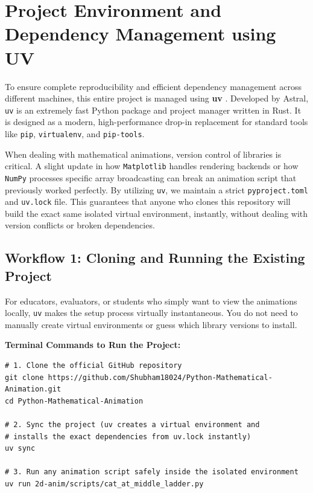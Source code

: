 \documentclass[12pt, a4paper]{report}
\begin{document}
\section{Project Environment and Dependency Management using UV}

To ensure complete reproducibility and efficient dependency management across different machines, this entire project is managed using \textbf{uv} \cite{uv_docs}. Developed by Astral, \texttt{uv} is an extremely fast Python package and project manager written in Rust. It is designed as a modern, high-performance drop-in replacement for standard tools like \texttt{pip}, \texttt{virtualenv}, and \texttt{pip-tools}.

When dealing with mathematical animations, version control of libraries is critical. A slight update in how \texttt{Matplotlib} handles rendering backends or how \texttt{NumPy} processes specific array broadcasting can break an animation script that previously worked perfectly. By utilizing \texttt{uv}, we maintain a strict \texttt{pyproject.toml} and \texttt{uv.lock} file. This guarantees that anyone who clones this repository will build the exact same isolated virtual environment, instantly, without dealing with version conflicts or broken dependencies.

\subsection{Workflow 1: Cloning and Running the Existing Project}
For educators, evaluators, or students who simply want to view the animations locally, \texttt{uv} makes the setup process virtually instantaneous. You do not need to manually create virtual environments or guess which library versions to install.

\vspace{0.2cm}
\begin{mdframed}[backgroundcolor=gray!10, linecolor=black, linewidth=1pt, roundcorner=5pt]
    \textbf{Terminal Commands to Run the Project:}
    \vspace{0.1cm}
    \begin{verbatim}
# 1. Clone the official GitHub repository
git clone https://github.com/Shubham18024/Python-Mathematical-Animation.git
cd Python-Mathematical-Animation

# 2. Sync the project (uv creates a virtual environment and 
# installs the exact dependencies from uv.lock instantly)
uv sync

# 3. Run any animation script safely inside the isolated environment
uv run 2d-anim/scripts/cat_at_middle_ladder.py
    \end{verbatim}
\end{mdframed}
\vspace{0.4cm}
\end{document}
